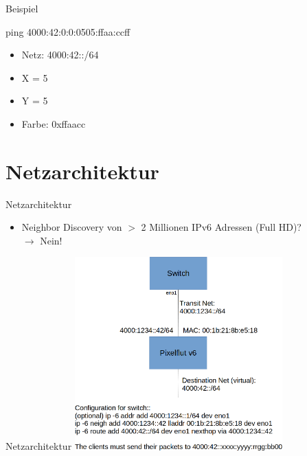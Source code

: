 \documentclass[12pt,donthandout,notes=dontshow,xcolor=table]{beamer}
\begin{document}
\begin{frame}{Beispiel}
	\begin{tcolorbox}[title=Beispiel]
	ping 4000:42:0:0:0505:ffaa:ccff\\
	\begin{itemize}
		\item Netz: 4000:42::/64
		\item X = 5
		\item Y = 5
		\item Farbe: 0xffaacc
	\end{itemize}
	\end{tcolorbox}
\end{frame}

\section{Netzarchitektur}
\begin{frame}{Netzarchitektur}
	\begin{itemize}
		\item Neighbor Discovery von $>$ 2 Millionen IPv6 Adressen (Full HD)?\\
		\pause
		$\rightarrow$ Nein!
	\end{itemize}
\end{frame}

\begin{frame}{Netzarchitektur}
\includegraphics[width=8cm]{figures/network_structure_cut}
\end{frame}
\end{document}
